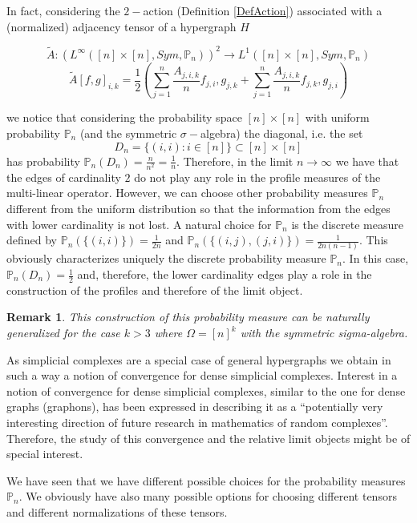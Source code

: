 \documentclass[11pt]{article}
\newtheorem{remark}[theorem]{Remark}
\begin{document}
In fact, considering the $2-$action (Definition \ref{DefAction}) associated with a (normalized) adjacency tensor of a hypergraph $H$ 

$$\widetilde{A}:(L^{\infty}([n]\times [n],Sym,\mathbb{P}_n))^2\longrightarrow L^{1}([n]\times [n],Sym,\mathbb{P}_n)$$
$$\widetilde{A}[f,g]_{i,k}=\frac{1}{2}(\sum^n_{j=1}\frac{A_{j,i,k}}{n}f_{j,i},g_{j,k} +\sum^n_{j=1}\frac{A_{j,i,k}}{n}f_{j,k},g_{j,i})
$$

we notice that considering the probability space $[n]\times [n]$ with uniform probability $\mathbb{P}_n$ (and the symmetric $\sigma-$algebra) the diagonal, i.e. the set 
$$
D_n=\{(i,i): i\in [n]\}\subset [n]\times [n]
$$
has probability $\mathbb{P}_n(D_n)=\frac{n}{n^2}=\frac{1}{n}$. Therefore, in the limit $n\rightarrow \infty$ we have that the edges of cardinality $2$ do not play any role in the profile measures of the multi-linear operator. However, we can choose other probability measures $\mathbb{P}_n$ different from the uniform distribution so that the information from the edges with lower cardinality is not lost. A natural choice for $\mathbb{P}_n$ is the discrete measure defined by $\mathbb{P}_n(\{(i,i)\})=\frac{1}{2n}$ and $\mathbb{P}_n(\{(i,j), (j,i)\}) =\frac{1}{2n(n-1)}$. This obviously characterizes uniquely the discrete probability measure $\mathbb{P}_n$. In this case, $\mathbb{P}_n(D_n)=\frac{1}{2}$ and, therefore, the lower cardinality edges play a role in the construction of the profiles and therefore of the limit object.


\begin{remark}
This construction of this  probability measure can be naturally generalized for the case $k>3$ where $\Omega=[n]^k$ with the symmetric sigma-algebra.
\end{remark}

As simplicial complexes are a special case of general hypergraphs we obtain in such a way a notion of convergence for dense simplicial complexes.  Interest in a notion of convergence for dense simplicial complexes, similar to the one for dense graphs (graphons), has been expressed in  \cite{Bobrowski2022} describing it as a “potentially very interesting direction of future research in mathematics of random complexes”. Therefore, the study of this convergence and the relative limit objects might be of special interest.

We have seen that we have different possible choices for the probability measures $\mathbb{P}_n$. We obviously have also many possible options for choosing different tensors and different normalizations of these tensors.
\end{document}
